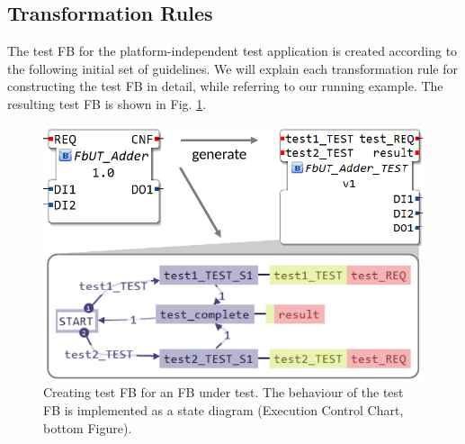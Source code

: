 \documentclass[conference]{IEEEtran}
\begin{document}

\subsection{Transformation Rules}
The test FB for the platform-independent test application is created according to the following initial set of guidelines. 
We will explain each transformation rule for constructing the test FB in detail, while referring to our running example. The resulting test FB is shown in Fig. \ref{fig:testfb}.

\begin{figure}[b!]
    \centering
    \vspace{-5mm}
    \includegraphics[width=\columnwidth]{Figures/testFB-crop.pdf}
    \caption{Creating test FB for an FB under test. The behaviour of the test FB is implemented as a state diagram (Execution Control Chart, bottom Figure).}
    \label{fig:testfb}
\end{figure}
\end{document}

